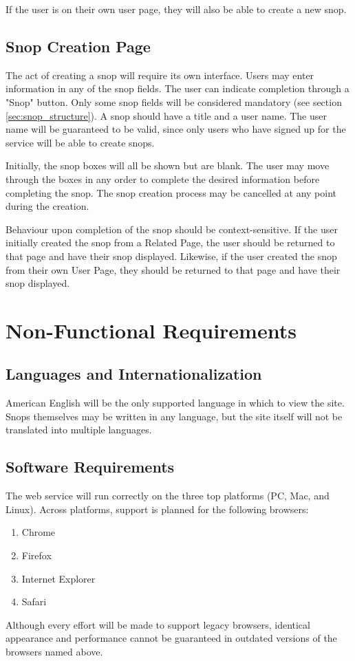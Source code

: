 \documentclass[11pt]{article}
\begin{document}
If the user is on their own user page, they will also be able to create a new snop.
\subsection{Snop Creation Page}
The act of creating a snop will require its own interface. Users may enter information in any of the snop fields. The user can indicate completion through a "Snop" button. Only some snop fields will be considered mandatory (see section \ref{sec:snop_structure}). A snop should have a title and a user name. The user name will be guaranteed to be valid, since only users who have signed up for the service will be able to create snops. 

Initially, the snop boxes will all be shown but are blank. The user may move through the boxes in any order to complete the desired information before completing the snop. The snop creation process may be cancelled at any point during the creation. 

Behaviour upon completion of the snop should be context-sensitive. If the user initially created the snop from a Related Page, the user should be returned to that page and have their snop displayed. Likewise, if the user created the snop from their own User Page, they should be returned to that page and have their snop displayed.
\section{Non-Functional Requirements}
\subsection{Languages and Internationalization}
American English will be the only supported language in which to view the site. Snops themselves may be written in any language, but the site itself will not be translated into multiple languages.
\subsection{Software Requirements}
The web service will run correctly on the three top platforms (PC, Mac, and Linux). Across platforms, support is planned for the following browsers:
\begin{enumerate}
\item Chrome
\item Firefox
\item Internet Explorer
\item Safari
\end{enumerate}
Although every effort will be made to support legacy browsers, identical appearance and performance cannot be guaranteed in outdated versions of the browsers named above.
\end{document}
